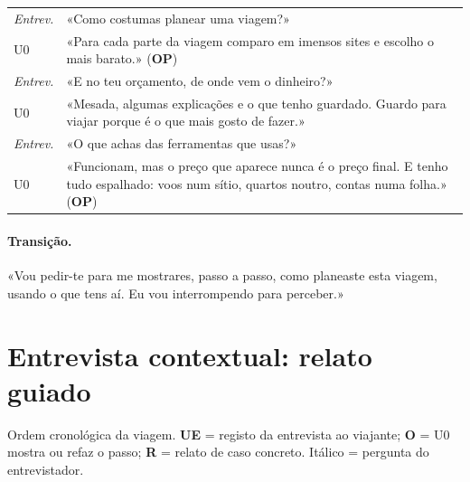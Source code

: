 \documentclass[11pt,a4paper]{article}
\begin{document}
\begin{tabularx}{\textwidth}{@{}p{1.6cm}L@{}}
\toprule
\textit{Entrev.} & «Como costumas planear uma viagem?» \\
U0 & «\textcolor{formal}{Para cada parte da viagem comparo em imensos sites 
e escolho o mais barato.}» 
(\textbf{OP}) \\
\textit{Entrev.} & «E no teu orçamento, de onde vem o dinheiro?» \\
U0 & «Mesada, algumas explicações e o que tenho guardado. Guardo para viajar porque é o que mais gosto de fazer.» \\
\textit{Entrev.} & «O que achas das ferramentas que usas?» \\
U0 & «\textcolor{formal}{Funcionam, mas o preço que aparece nunca é o preço final. E tenho tudo espalhado: voos num sítio, quartos noutro, contas numa folha.}» (\textbf{OP}) \\
\bottomrule
\end{tabularx}

\paragraph{Transição.} «Vou pedir-te para me mostrares, passo a passo, como planeaste esta viagem, usando o que tens aí. Eu vou interrompendo para perceber.»

\section{Entrevista contextual: relato guiado}
Ordem cronológica da viagem. \textbf{UE} = registo da entrevista ao viajante; \textbf{O} = U0 mostra ou refaz o passo; \textbf{R} = relato de caso concreto. Itálico = pergunta do entrevistador.
\end{document}
